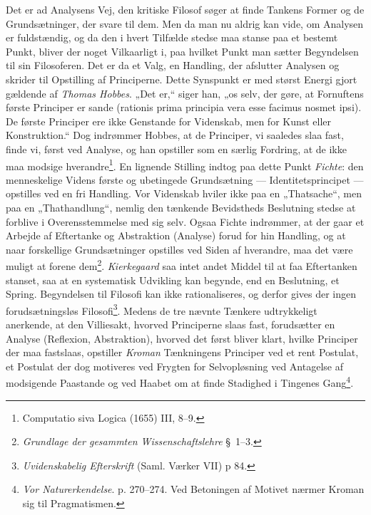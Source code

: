 \documentclass[12pt,a4paper]{book}
\newcommand{\apage}[1]{\marginnote{\footnotesize\textit{[#1]}}}
\begin{document}
Det er ad Analysens Vej, den kritiske Filosof søger at finde Tankens Former og de
Grundsætninger, der svare til dem. Men da man nu aldrig kan vide, om Analysen er
fuldstændig, og da den i hvert Tilfælde stedse maa stanse paa et bestemt Punkt,
bliver der noget Vilkaarligt i, paa hvilket Punkt man sætter Begyndelsen til sin
Filosoferen. Det er da et Valg, en Handling, der afslutter Analysen og skrider til
Opstilling af Principerne. Dette Synspunkt er med størst Energi gjort gældende af
\emph{Thomas Hobbes}. „Det er,“ siger han, „os selv, der gøre, at Fornuftens første
Principer er sande (rationis prima principia vera esse facimus nosmet ipsi). De
første Principer ere ikke Genstande for Videnskab, men for Kunst eller
Konstruktion.“ Dog indrømmer Hobbes, at de Principer, vi saaledes slaa fast, finde
vi, først ved Analyse, og han opstiller som en særlig Fordring, at de ikke maa
modsige hverandre\footnote{Computatio siva Logica (1655) III, 8--9.}. En lignende
Stilling indtog paa dette Punkt \emph{Fichte}: den menneskelige Videns første og
ubetingede Grundsætning --- Identitetsprincipet --- opstilles ved en fri Handling.
Vor Videnskab hviler ikke paa en „Thatsache“, men paa en „Thathandlung“, nemlig den \apage{268}
tænkende Bevidstheds Beslutning stedse at forblive i Overensstemmelse med sig selv.
Ogsaa Fichte indrømmer, at der gaar et Arbejde af Eftertanke og Abstraktion
(Analyse) forud for hin Handling, og at naar forskellige Grundsætninger opstilles
ved Siden af hverandre, maa det være muligt at forene dem\footnote{\emph{Grundlage
der gesammten Wissenschaftslehre} \S\ 1--3.}. \emph{Kierkegaard} saa intet andet
Middel til at faa Eftertanken stanset, saa at en systematisk Udvikling kan begynde,
end en Beslutning, et Spring. Begyndelsen til Filosofi kan ikke rationaliseres, og
derfor gives der ingen forudsætningsløs Filosofi\footnote{\emph{Uvidenskabelig
Efterskrift} (Saml. Værker VII) p 84.}. Medens de tre nævnte Tænkere udtrykkeligt
anerkende, at den Villiesakt, hvorved Principerne slaas fast, forudsætter en
Analyse (Reflexion, Abstraktion), hvorved det først bliver klart, hvilke Principer
der maa fastslaas, opstiller \emph{Kroman} Tænkningens Principer ved et rent
Postulat, et Postulat der dog motiveres ved Frygten for Selvopløsning ved Antagelse
af modsigende Paastande og ved Haabet om at finde Stadighed i Tingenes
Gang\footnote{\emph{Vor Naturerkendelse}. p. 270--274. Ved Betoningen af Motivet
nærmer Kroman sig til Pragmatismen.}.
\end{document}
